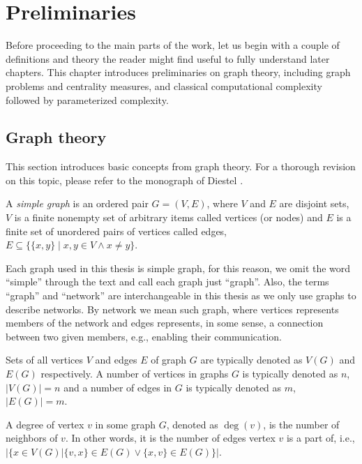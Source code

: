 \chapter{Preliminaries}

Before proceeding to the main parts of the work,
let us begin with a couple of definitions and theory the reader might find useful to fully understand later chapters.
This chapter introduces preliminaries on graph theory, including graph problems and centrality measures, and 
classical computational complexity followed by parameterized complexity.


\section{Graph theory}

This section introduces basic concepts from graph theory.
For a thorough revision on this topic, please refer to the monograph of Diestel \cite{Diestel2018}.

\begin{definition}
    A \emph{simple graph} is an ordered pair $G=(V,E)$, where $V$ and $E$ are disjoint sets,
    $V$ is a finite nonempty set of arbitrary items called vertices (or nodes) and 
    $E$ is a finite set of unordered pairs of vertices called edges, $E \subseteq \{\{x,y\} \mid x,y \in V \wedge x \neq y\}$.
\end{definition}

Each graph used in this thesis is simple graph, for this reason,
we omit the word ``simple'' through the text and call each graph just ``graph''.
Also, the terms ``graph'' and ``network'' are interchangeable in this thesis as we only use graphs to describe networks.
By network we mean such graph, where vertices represents members of the network 
and edges represents, in some sense, a connection between two given members, e.g., enabling their communication.

Sets of all vertices $V$ and edges $E$ of graph $G$ are typically denoted as $V(G)$ and $E(G)$ respectively.
A number of vertices in graphs $G$ is typically denoted as $n$, $|V(G)| = n$ and
a number of edges in $G$ is typically denoted as $m$, $|E(G)| = m$.

\begin{definition}
    A degree of vertex $v$ in some graph $G$, denoted as $\deg(v)$, is the number of neighbors of $v$.
    In other words, it is the number of edges vertex $v$ is a part of, i.e.,
    $\Big|\{x \in V(G) \vert \{v,x\} \in E(G) \vee \{x,v\} \in E(G)\}\Big|$.
\end{definition}

